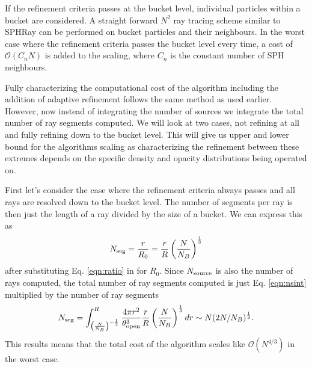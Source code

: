 \documentclass[fleq,usenatbib]{mnras}
\newcommand{\bigO}[1]{\mathcal{O}\left(#1\right)}
\newcommand{\NS}{N_{\rm source}}
\newcommand{\tO}{\theta_{\rm open}}
\begin{document}
If the refinement criteria passes at the bucket level, individual particles 
within a bucket are considered. A straight forward $N^2$ ray tracing scheme 
similar to SPHRay \citep{altayEt08} can be performed on bucket particles and 
their neighbours. In the worst case where the refinement criteria passes the 
bucket level every time, a cost of $\bigO{C_n N}$ is added to the scaling, 
where $C_n$ is the constant number of SPH neighbours.

Fully characterizing the computational cost of the algorithm including the 
addition of adaptive refinement follows the same method as used earlier. 
However, now instead of integrating the number of sources we integrate the 
total number of ray segments computed. We will look at two cases, not refining 
at all and fully refining down to the bucket level. This will give us upper 
and lower bound for the algorithms scaling as characterizing the refinement 
between these extremes depends on the specific density and opacity 
distributions being operated on.

First let's consider the case where the refinement criteria always passes and 
all rays are resolved down to the bucket level. The number of segments per ray 
is then just the length of a ray divided by the size of a bucket. We can 
express this as
\begin{equation}
\label{eqn:nseg}
N_{\rm seg} = \frac{r}{R_0} = \frac{r}{R}\left(\frac{N}{N_B}\right)^\frac{1}{3}
\end{equation}
after substituting Eq. \ref{eqn:ratio} in for $R_0$. Since $\NS$ is also the 
number of rays computed, the total number of ray segments computed is just Eq. 
\ref{eqn:nsint} multiplied by the number of ray segments
\begin{equation}
\label{eqn:nsegint}
N_{\rm seg} = \int_{\left(\frac{N}{N_B}\right)^{-\frac{1}{3}}}^R 
\frac{4\pi r^2}{\tO^3}
\frac{r}{R}\left(\frac{N}{N_B}\right)^\frac{1}{3} dr
\sim N(2N/N_B)^\frac{1}{3}.
\end{equation}
This results means that the total cost of the algorithm scales like 
$\bigO{N^{4/3}}$ in the worst case.
\end{document}
